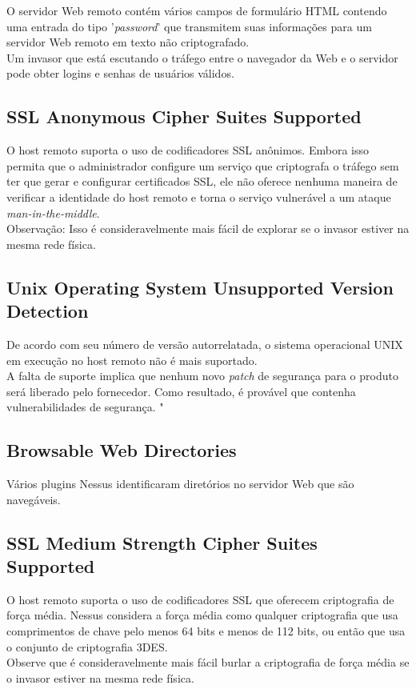 \documentclass[
	12pt,				%
	openright,			%
	twoside,			%
	a4paper,			%
	english,			%
	french,				%
	spanish,			%
	brazil				%
	]{abntex2}
\begin{document}
	O servidor Web remoto contém vários campos de formulário HTML contendo uma entrada do tipo '\textit{password}' que transmitem suas informações para um servidor Web remoto em texto não criptografado.
 \\
	Um invasor que está escutando o tráfego entre o navegador da Web e o servidor pode obter logins e senhas de usuários válidos.

\subsection{SSL Anonymous Cipher Suites Supported}
 O host remoto suporta o uso de codificadores SSL anônimos. Embora isso permita que o administrador configure um serviço que criptografa o tráfego sem ter que gerar e configurar certificados SSL, ele não oferece nenhuma maneira de verificar a identidade do host remoto e torna o serviço vulnerável a um ataque \textit{man-in-the-middle}.
 \\
 Observação: Isso é consideravelmente mais fácil de explorar se o invasor estiver na mesma rede física.

\subsection{Unix Operating System Unsupported Version Detection}
 De acordo com seu número de versão autorrelatada, o sistema operacional UNIX em execução no host remoto não é mais suportado.
 \\
A falta de suporte implica que nenhum novo \textit{patch} de segurança para o produto será liberado pelo fornecedor. Como resultado, é provável que contenha vulnerabilidades de segurança.  "

\subsection{Browsable Web Directories}
 Vários plugins Nessus identificaram diretórios no servidor Web que são navegáveis.

\subsection{SSL Medium Strength Cipher Suites Supported}
 O host remoto suporta o uso de codificadores SSL que oferecem criptografia de força média. Nessus considera a força média como qualquer criptografia que usa comprimentos de chave pelo menos 64 bits e menos de 112 bits, ou então que usa o conjunto de criptografia 3DES.
\\
Observe que é consideravelmente mais fácil burlar a criptografia de força média se o invasor estiver na mesma rede física.
\end{document}
